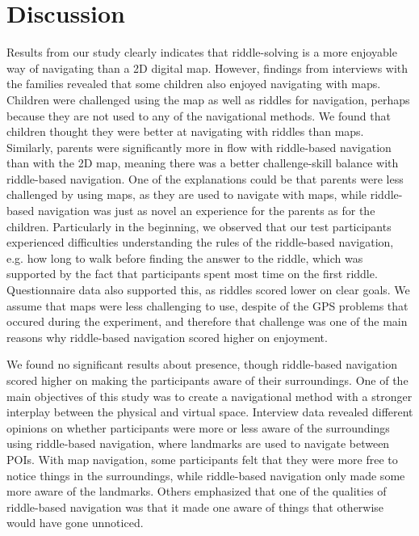 \section{Discussion}
Results from our study clearly indicates that riddle-solving is a more enjoyable way of navigating than a 2D digital map. However, findings from interviews with the families revealed that some children also enjoyed navigating with maps. Children were challenged using the map as well as riddles for navigation, perhaps because they are not used to any of the navigational methods. We found that children thought they were better at navigating with riddles than maps. Similarly, parents were significantly more in flow with riddle-based navigation than with the 2D map, meaning there was a better challenge-skill balance with riddle-based navigation. One of the explanations could be that parents were less challenged by using maps, as they are used to navigate with maps, while riddle-based navigation was just as novel an experience for the parents as for the children. Particularly in the beginning, we observed that our test participants experienced difficulties understanding the rules of the riddle-based navigation, e.g. how long to walk before finding the answer to the riddle, which was supported by the fact that participants spent most time on the first riddle. Questionnaire data also  supported this, as riddles scored lower on clear goals. We assume that maps were less challenging to use, despite of the GPS problems that occured during the experiment, and therefore that challenge was one of the main reasons why riddle-based navigation scored higher on enjoyment. 


We found no significant results about presence, though riddle-based navigation scored higher on making the participants aware of their surroundings. One of the main objectives of this study was to create a navigational method with a stronger interplay between the physical and virtual space. Interview data revealed different opinions on whether participants were more or less aware of the surroundings using riddle-based navigation, where landmarks are used to navigate between POIs. With map navigation, some participants felt that they were more free to notice things in the surroundings, while riddle-based navigation only made some more aware of the landmarks. Others emphasized that one of the qualities of riddle-based navigation was that it made one aware of things that otherwise would have gone unnoticed.

